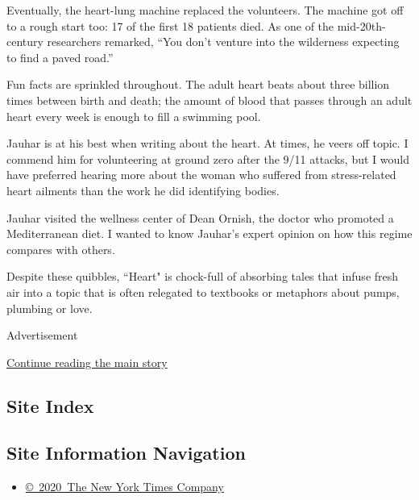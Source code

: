 Eventually, the heart-lung machine replaced the volunteers. The machine
got off to a rough start too: 17 of the first 18 patients died. As one
of the mid-20th-century researchers remarked, ``You don't venture into
the wilderness expecting to find a paved road.''

Fun facts are sprinkled throughout. The adult heart beats about three
billion times between birth and death; the amount of blood that passes
through an adult heart every week is enough to fill a swimming pool.

Jauhar is at his best when writing about the heart. At times, he veers
off topic. I commend him for volunteering at ground zero after the 9/11
attacks, but I would have preferred hearing more about the woman who
suffered from stress-related heart ailments than the work he did
identifying bodies.

Jauhar visited the wellness center of Dean Ornish, the doctor who
promoted a Mediterranean diet. I wanted to know Jauhar's expert opinion
on how this regime compares with others.

Despite these quibbles, ``Heart" is chock-full of absorbing tales that
infuse fresh air into a topic that is often relegated to textbooks or
metaphors about pumps, plumbing or love.

Advertisement

\protect\hyperlink{after-bottom}{Continue reading the main story}

\hypertarget{site-index}{%
\subsection{Site Index}\label{site-index}}

\hypertarget{site-information-navigation}{%
\subsection{Site Information
Navigation}\label{site-information-navigation}}

\begin{itemize}
\tightlist
\item
  \href{https://help.nytimes3xbfgragh.onion/hc/en-us/articles/115014792127-Copyright-notice}{©~2020~The
  New York Times Company}
\end{itemize}

